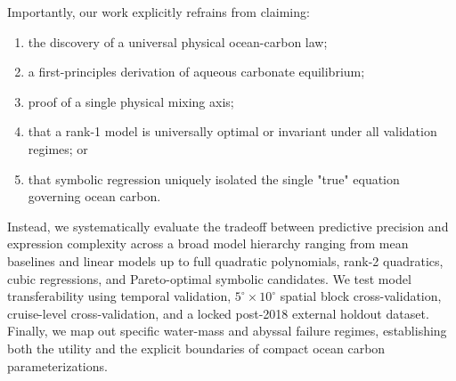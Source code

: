 Importantly, our work explicitly refrains from claiming:
\begin{enumerate}[label=(\roman*)]
\item the discovery of a universal physical ocean-carbon law;
\item a first-principles derivation of aqueous carbonate equilibrium;
\item proof of a single physical mixing axis;
\item that a rank-1 model is universally optimal or invariant under all validation regimes; or
\item that symbolic regression uniquely isolated the single "true" equation governing ocean carbon.
\end{enumerate}

Instead, we systematically evaluate the tradeoff between predictive precision and expression complexity across a broad model hierarchy ranging from mean baselines and linear models up to full quadratic polynomials, rank-2 quadratics, cubic regressions, and Pareto-optimal symbolic candidates. We test model transferability using temporal validation, $5^\circ \times 10^\circ$ spatial block cross-validation, cruise-level cross-validation, and a locked post-2018 external holdout dataset. Finally, we map out specific water-mass and abyssal failure regimes, establishing both the utility and the explicit boundaries of compact ocean carbon parameterizations.
